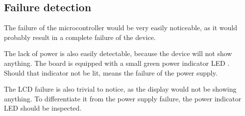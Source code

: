 \documentclass[10pt]{article}
\begin{document}
\subsection{Failure detection}

The failure of the microcontroller would be very easily noticeable, as it would probably result in a complete failure of the device.
    
The lack of power is also easily detectable, because the device will not show anything.
The board is equipped with a small green power indicator LED \cite{eduboard-man}. 
Should that indicator not be lit, means the failure of the power supply.

The LCD failure is also trivial to notice, as the display would not be showing anything.
To differentiate it from the power supply failure, the power indicator LED should be inspected.

\nocite{*}


\end{document}
